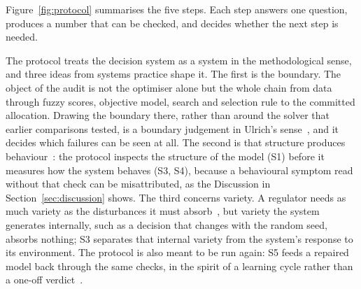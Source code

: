 \documentclass[systems,article,submit,moreauthors,pdftex]{Definitions/mdpi}
\begin{document}
Figure~\ref{fig:protocol} summarises the five steps. Each step answers one question,
produces a number that can be checked, and decides whether the next step is needed.

The protocol treats the decision system as a system in the methodological sense, and three
ideas from systems practice shape it. The first is the boundary. The object of the audit is
not the optimiser alone but the whole chain from data through fuzzy scores, objective model,
search and selection rule to the committed allocation. Drawing the boundary there, rather
than around the solver that earlier comparisons tested, is a boundary judgement in Ulrich's
sense~\cite{ulrich1987critical}, and it decides which failures can be seen at all. The second
is that structure produces behaviour~\cite{sterman2002allmodels}: the protocol inspects the
structure of the model (S1) before it measures how the system behaves (S3, S4), because a
behavioural symptom read without that check can be misattributed, as the
Discussion in Section~\ref{sec:discussion} shows. The third concerns variety. A regulator needs as much variety
as the disturbances it must absorb~\cite{ashby1956cybernetics}, but variety the system
generates internally, such as a decision that changes with the random seed, absorbs nothing;
S3 separates that internal variety from the system's response to its environment. The
protocol is also meant to be run again: S5 feeds a repaired model back through the same
checks, in the spirit of a learning cycle rather than a one-off verdict~\cite{checkland2000ssm}.
\end{document}
